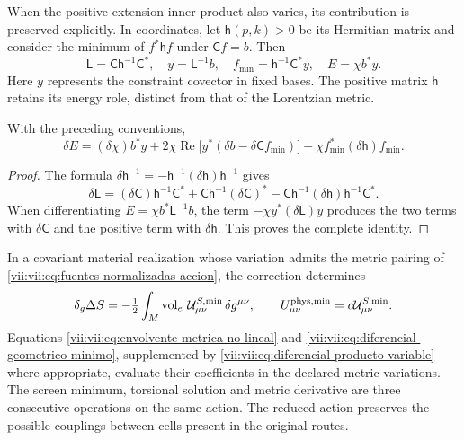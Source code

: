 When the positive extension inner product also varies, its
contribution is preserved explicitly. In coordinates, let
\(\mathsf h(p,k)>0\) be its Hermitian matrix and consider the minimum
of \(f^*\mathsf h f\) under \(\mathsf C f=b\). Then
\begin{equation}
 \mathsf L=\mathsf C\mathsf h^{-1}\mathsf C^*,\quad
 y=\mathsf L^{-1}b,\quad
 f_{\min}=\mathsf h^{-1}\mathsf C^*y,\quad
 E=\chi b^*y.
 \label{vii:vii:eq:minimo-producto-variable}
\end{equation}
Here \(y\) represents the constraint covector in fixed
bases. The positive matrix \(\mathsf h\) retains its energy
role, distinct from that of the Lorentzian metric.

\begin{lemma}
\label{vii:vii:lem:producto-variable-extension}
With the preceding conventions,
\begin{equation}
 \delta E=(\delta\chi)b^*y
   +2\chi\operatorname{Re}\bigl[y^*(\delta b-\delta\mathsf C f_{\min})\bigr]
   +\chi f_{\min}^*(\delta\mathsf h)f_{\min}.
 \label{vii:vii:eq:diferencial-producto-variable}
\end{equation}
\end{lemma}
\begin{proof}
The formula \(\delta\mathsf h^{-1}
=-\mathsf h^{-1}(\delta\mathsf h)\mathsf h^{-1}\) gives
\[
 \delta\mathsf L=(\delta\mathsf C)\mathsf h^{-1}\mathsf C^*
 +\mathsf C\mathsf h^{-1}(\delta\mathsf C)^*
 -\mathsf C\mathsf h^{-1}(\delta\mathsf h)
                              \mathsf h^{-1}\mathsf C^*.
\]
When differentiating \(E=\chi b^*\mathsf L^{-1}b\), the term
\(-\chi y^*(\delta\mathsf L)y\) produces the two terms
with \(\delta\mathsf C\) and the positive term with
\(\delta\mathsf h\). This proves the complete identity.
\end{proof}

In a covariant material realization whose variation admits the
metric pairing of
\eqref{vii:vii:eq:fuentes-normalizadas-accion}, the correction determines
\begin{equation}
 \delta_g\Delta S
 =-\tfrac12\int_M\operatorname{vol}_e\,
          \mathcal U^{S,\min}_{\mu\nu}\,\delta g^{\mu\nu},
 \qquad U^{\rm phys,\min}_{\mu\nu}
                      =c\mathcal U^{S,\min}_{\mu\nu}.
 \label{vii:vii:eq:fuente-metrica-minimo-no-lineal}
\end{equation}
Equations \eqref{vii:vii:eq:envolvente-metrica-no-lineal} and
\eqref{vii:vii:eq:diferencial-geometrico-minimo}, supplemented by
\eqref{vii:vii:eq:diferencial-producto-variable} where appropriate,
evaluate their coefficients in the declared metric variations.
The screen minimum, torsional solution and metric derivative
are three consecutive operations on the same action.
The reduced action preserves the possible couplings between
cells present in the original routes.

